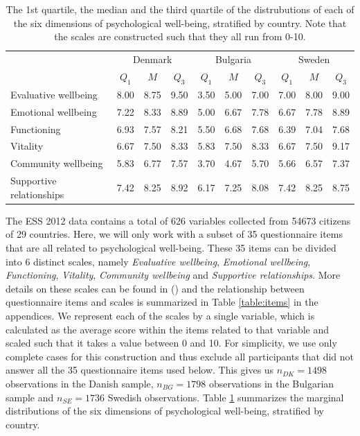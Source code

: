 \documentclass[titlepage,11pt,twoside]{article}
\begin{document}
{\begin{table}[t]
\centering
\begin{tabular}{lccccccccc}
  \hline
  & \multicolumn{3}{c}{Denmark} & \multicolumn{3}{c}{Bulgaria} & \multicolumn{3}{c}{Sweden} \\
 & $Q_1$ & $M$ & $Q_3$ \quad & $Q_1$ & $M$ & $Q_3$ \quad & $Q_1$ & $M$ & $Q_3$ \\
  \hline
 Evaluative wellbeing & 8.00 & 8.75 & 9.50 & 3.50 & 5.00 & 7.00 & 7.00 & 8.00 & 9.00 \\
 Emotional wellbeing & 7.22 & 8.33 & 8.89 & 5.00 & 6.67 & 7.78 & 6.67 & 7.78 & 8.89 \\
Functioning & 6.93 & 7.57 & 8.21 & 5.50 & 6.68 & 7.68 & 6.39 & 7.04 & 7.68 \\
Vitality & 6.67 & 7.50 & 8.33 & 5.83 & 7.50 & 8.33 & 6.67 & 7.50 & 9.17 \\
 Community wellbeing & 5.83 & 6.77 & 7.57 & 3.70 & 4.67 & 5.70 & 5.66 & 6.57 & 7.37 \\
Supportive relationships & 7.42 & 8.25 & 8.92 & 6.17 & 7.25 & 8.08 & 7.42 & 8.25 & 8.75 \\
   \hline
\end{tabular}
\caption{The 1st quartile, the median and the third quartile of the distrubutions of each of the six dimensions of psychological well-being, stratified by country. Note that the scales are constructed such that they all run from 0-10.}
\label{tableDistr}
\end{table}

The ESS 2012 data contains a total of 626 variables collected from 54673 citizens of 29 countries. Here, we will only work with a subset of 35 questionnaire items that are all related to psychological well-being. These 35 items can be divided into 6 distinct scales, namely \textit{Evaluative wellbeing}, \textit{Emotional wellbeing}, \textit{Functioning}, \textit{Vitality}, \textit{Community wellbeing} and \textit{Supportive relationships}. More details on these scales can be found in (\cite{ESStopline5}) and the relationship between questionnaire items and scales is summarized in Table \ref{table:items} in the appendices. We represent each of the scales by a single variable, which is calculated as the average score within the items related to that variable and scaled such that it takes a value between 0 and 10. For simplicity, we use only complete cases for this construction and thus exclude all participants that did not answer all the 35 questionnaire items used below. This gives us $n_{DK} = 1498$ observations in the Danish sample, $n_{BG} = 1798$ observations in the Bulgarian sample and $n_{SE} = 1736$ Swedish observations. Table \ref{tableDistr} summarizes the marginal distributions of the six dimensions of psychological well-being, stratified by country.



}
\end{document}
